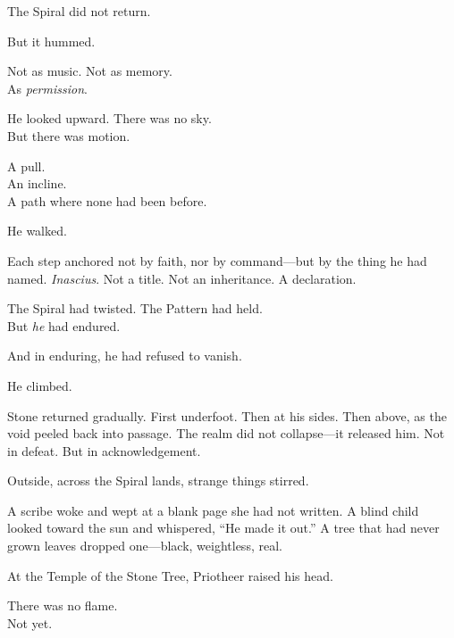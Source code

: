 \documentclass[12pt]{article}
\begin{document}
\vspace{0.5em}
The Spiral did not return.

\vspace{0.5em}
But it hummed.

\vspace{0.5em}
Not as music. Not as memory.\\
As \textit{permission}.

\vspace{0.5em}
He looked upward. There was no sky.\\
But there was motion.

\vspace{0.5em}
A pull.\\
An incline.\\
A path where none had been before.

\vspace{0.5em}
He walked.

\vspace{0.5em}
Each step anchored not by faith, nor by command---but by the thing he had named. \textit{Inascius}. Not a title. Not an inheritance. A declaration.

\vspace{0.5em}
The Spiral had twisted. The Pattern had held.\\
But \textit{he} had endured.

\vspace{0.5em}
And in enduring, he had refused to vanish.

\vspace{0.5em}
He climbed.

\vspace{0.5em}
Stone returned gradually. First underfoot. Then at his sides. Then above, as the void peeled back into passage. The realm did not collapse---it released him. Not in defeat. But in acknowledgement.

\vspace{0.5em}
Outside, across the Spiral lands, strange things stirred.

\vspace{0.5em}
A scribe woke and wept at a blank page she had not written. A blind child looked toward the sun and whispered, ``He made it out.'' A tree that had never grown leaves dropped one---black, weightless, real.

\vspace{0.5em}
At the Temple of the Stone Tree, Priotheer raised his head.

\vspace{0.5em}
There was no flame.\\
Not yet.
\end{document}
